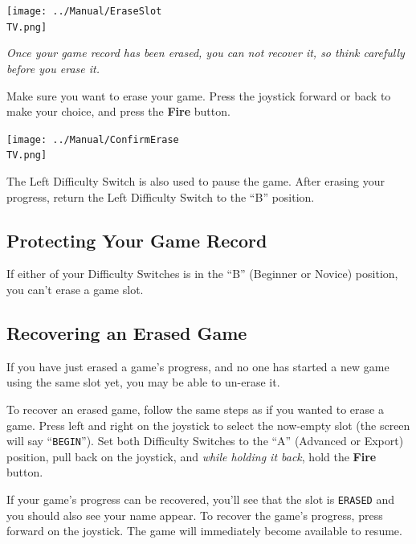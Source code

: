 \documentclass[10pt,twocolumn,openany,article]{memoir}
\newcommand\TV{NTSC}
\newcommand\TV{PAL}
\newcommand\TV{SECAM}
\begin{document}
\begin{center}
  \texttt{[image: ../Manual/EraseSlot\\TV.png]}
\end{center}

\ifdefined\DEMO

\emph{Once your game record has been  erased, you can not recover it, so
  think carefully before you erase it.}

\else

Make sure  you want to  erase your game.  Press the joystick  forward or
back to make your choice, and press the \textbf{Fire} button.

\begin{center}
  \texttt{[image: ../Manual/ConfirmErase\\TV.png]}
\end{center}

\fi

\ifdefined\TVSECAM

The Left Difficulty Switch is also used to pause the game. After erasing
your progress, return the Left Difficulty Switch to the ``B'' position.

\fi

\subsection{Protecting Your Game Record}

If  either of  your Difficulty  Switches is  in the  ``B'' (Beginner  or
Novice) position, you can't erase a game slot.

\ifdefined\DEMO\else

\subsection{Recovering an Erased Game}

If you have just erased a game's  progress, and no one has started a new
game using the same slot yet, you may be able to un-erase it.

To recover  an erased game,  follow the same steps  as if you  wanted to
erase  a game.  Press  left and  right  on the  joystick  to select  the
now-empty  slot  (the  screen  will say  ``\texttt{BEGIN}'').  Set  both
Difficulty Switches  to the  ``A'' (Advanced  or Export)  position, pull
back  on  the joystick,  and  \emph{while  holding  it back},  hold  the
\textbf{Fire} button.

If your  game's progress can be  recovered, you'll see that  the slot is
\texttt{ERASED} and you should also see your name appear. To recover the
game's progress, press forward on the joystick. The game will immediately
become available to resume.
\end{document}
